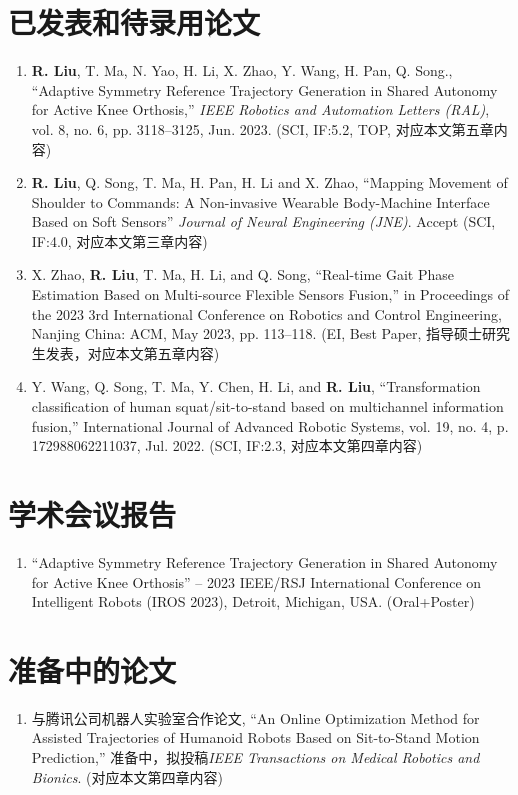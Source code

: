 
\begin{publications}

\section*{已发表和待录用论文}

\begin{enumerate}
\item \textbf{R. Liu}, T. Ma, N. Yao, H. Li, X. Zhao, Y. Wang, H. Pan, Q. Song., “Adaptive Symmetry Reference Trajectory Generation in Shared Autonomy for Active Knee Orthosis,” \textit{IEEE Robotics and Automation Letters (RAL)}, vol. 8, no. 6, pp. 3118–3125, Jun. 2023. (SCI, IF:5.2, TOP, 对应本文第五章内容)
\item \textbf{R. Liu}, Q. Song, T. Ma, H. Pan, H. Li and X. Zhao, ``Mapping Movement of Shoulder to Commands: A Non-invasive Wearable Body-Machine Interface Based on Soft Sensors'' \textit{Journal of Neural Engineering (JNE)}. Accept (SCI, IF:4.0, 对应本文第三章内容)
\item X. Zhao, \textbf{R. Liu}, T. Ma, H. Li, and Q. Song, “Real-time Gait Phase Estimation Based on Multi-source Flexible Sensors Fusion,” in Proceedings of the 2023 3rd International Conference on Robotics and Control Engineering, Nanjing China: ACM, May 2023, pp. 113–118. (EI, Best Paper, 指导硕士研究生发表，对应本文第五章内容)
\item Y. Wang, Q. Song, T. Ma, Y. Chen, H. Li, and \textbf{R. Liu}, “Transformation classification of human squat/sit-to-stand based on multichannel information fusion,” International Journal of Advanced Robotic Systems, vol. 19, no. 4, p. 172988062211037, Jul. 2022. (SCI, IF:2.3, 对应本文第四章内容)
\end{enumerate}

\section*{学术会议报告}
\begin{enumerate}
\item ``Adaptive Symmetry Reference Trajectory Generation in Shared Autonomy for Active Knee Orthosis'' – 2023 IEEE/RSJ International Conference on Intelligent Robots (IROS 2023), Detroit, Michigan, USA. (Oral+Poster)
\end{enumerate}

\section*{准备中的论文}
\begin{enumerate}
\item 与腾讯公司机器人实验室合作论文, ``An Online Optimization Method for Assisted Trajectories of Humanoid Robots Based on Sit-to-Stand Motion Prediction,'' 准备中，拟投稿\textit{IEEE Transactions on Medical Robotics and Bionics}. (对应本文第四章内容)
\end{enumerate}


\end{publications}
